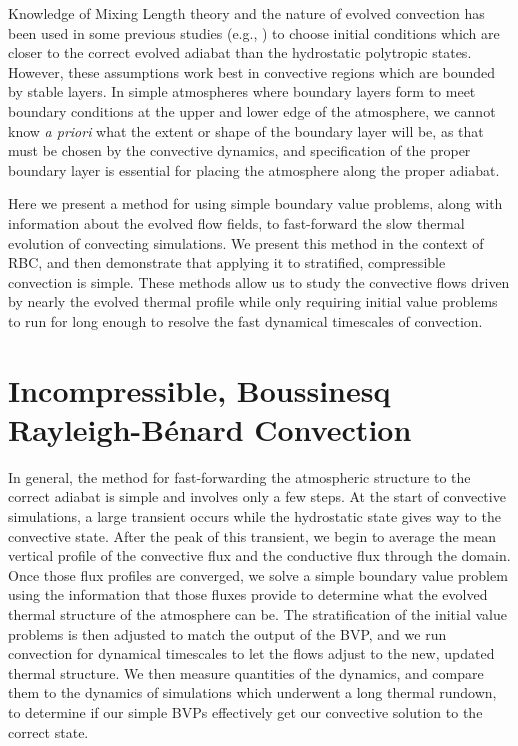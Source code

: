 \documentclass[aps, pre, onecolumn, nofootinbib, notitlepage, groupedaddress, amsfonts, amssymb, amsmath, longbibliography]{revtex4-1}
\newcommand{\RB}{Rayleigh-B\'{e}nard }
\begin{document}
Knowledge of Mixing Length theory and the nature of evolved convection has been used in some 
previous studies (e.g., \cite{brandenburg&all2005}) to choose initial conditions which are
closer to the correct evolved adiabat than
the hydrostatic polytropic states.  However, these assumptions work best in convective regions
which are bounded by stable layers.  In simple atmospheres where boundary layers form to meet
boundary conditions at the upper and lower edge of the atmosphere, we cannot know 
\emph{a priori} what the extent or shape of the boundary layer will be, as that must be chosen
by the convective dynamics, and specification of the proper boundary layer is essential for
placing the atmosphere along the proper adiabat.

Here we present a method for using simple boundary value problems, 
along with information about the evolved flow fields,
to fast-forward the slow thermal evolution of convecting simulations.  
We present this method in the context of RBC, and
then demonstrate that applying it to stratified, compressible convection 
is simple.  These methods allow us to study the convective flows driven by 
nearly the evolved thermal profile while only requiring initial value problems to run
for long enough to resolve the fast dynamical timescales of convection.


\section{Incompressible, Boussinesq \RB Convection}
\label{sec:experiment}
In general, the method for fast-forwarding the atmospheric structure to the correct adiabat is
simple and involves only a few steps.  At the start of convective simulations, a large transient
occurs while the hydrostatic state gives way to the convective state.  After the peak of this
transient, we begin to average the mean vertical profile of the convective flux and the conductive
flux through the domain.  Once those flux profiles are converged, we solve a simple 
boundary value problem using the information that those fluxes provide to determine what the
evolved thermal structure of the atmosphere can be.  The stratification of the initial value
problems is then adjusted to match the output of the BVP, and we run convection for dynamical
timescales to let the flows adjust to the new, updated thermal structure.  We then measure
quantities of the dynamics, and compare them to the dynamics of simulations which underwent a
long thermal rundown, to determine if our simple BVPs effectively get our convective solution
to the correct state.
\end{document}
